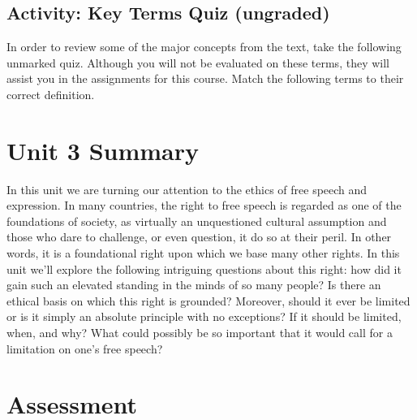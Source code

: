 \documentclass[
]{book}
\begin{document}
\hypertarget{activity-key-terms-quiz-ungraded-2}{%
\subsection*{Activity: Key Terms Quiz (ungraded)}\label{activity-key-terms-quiz-ungraded-2}}

\begin{reflect}
In order to review some of the major concepts from the text, take the following unmarked quiz. Although you will not be evaluated on these terms, they will assist you in the assignments for this course. Match the following terms to their correct definition.
\end{reflect}

\hypertarget{unit-3-summary}{%
\section*{Unit 3 Summary}\label{unit-3-summary}}

In this unit we are turning our attention to the ethics of free speech and expression. In many countries, the right to free speech is regarded as one of the foundations of society, as virtually an unquestioned cultural assumption and those who dare to challenge, or even question, it do so at their peril. In other words, it is a foundational right upon which we base many other rights. In this unit we'll explore the following intriguing questions about this right: how did it gain such an elevated standing in the minds of so many people? Is there an ethical basis on which this right is grounded? Moreover, should it ever be limited or is it simply an absolute principle with no exceptions? If it should be limited, when, and why? What could possibly be so important that it would call for a limitation on one's free speech?

\hypertarget{assessment-5}{%
\section*{Assessment}\label{assessment-5}}
\end{document}
